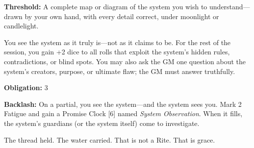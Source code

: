 \textbf{Threshold:} A complete map or diagram of the system you wish to understand—drawn by your own hand, with every detail correct, under moonlight or candlelight.

You see the system as it truly is—not as it claims to be. For the rest of the session, you gain +2 dice to all rolls that exploit the system's hidden rules, contradictions, or blind spots. You may also ask the GM one question about the system's creators, purpose, or ultimate flaw; the GM must answer truthfully.

\textbf{Obligation:} 3

\textbf{Backlash:} On a partial, you see the system—and the system sees you. Mark 2 Fatigue and gain a Promise Clock [6] named \textit{System Observation}. When it fills, the system's guardians (or the system itself) come to investigate.

The thread held. The water carried. That is not a Rite. That is grace.
